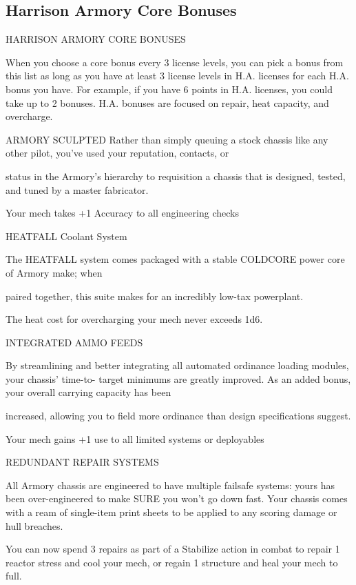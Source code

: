 \subsection{Harrison Armory Core Bonuses}

                           HARRISON ARMORY CORE BONUSES

When you choose a core bonus every 3 license levels, you can pick a bonus from this list as long
as you have at least 3 license levels in H.A. licenses for each H.A. bonus you have. For example,
if you have 6 points in H.A. licenses, you could take up to 2 bonuses. H.A. bonuses are focused
on repair, heat capacity, and overcharge.


ARMORY SCULPTED
Rather than simply queuing a stock chassis like any other pilot, you’ve used your reputation, contacts, or

status in the Armory’s hierarchy to requisition a chassis that is designed, tested, and tuned by a master
fabricator.

Your mech takes +1 Accuracy to all engineering checks


HEATFALL Coolant System

The HEATFALL system comes packaged with a stable COLDCORE power core of Armory make; when

paired together, this suite makes for an incredibly low-tax powerplant.

The heat cost for overcharging your mech never exceeds 1d6.


INTEGRATED AMMO FEEDS

By streamlining and better integrating all automated ordinance loading modules, your chassis’ time-to-
target minimums are greatly improved. As an added bonus, your overall carrying capacity has been

increased, allowing you to field more ordinance than design specifications suggest.

Your mech gains +1 use to all limited systems or deployables


REDUNDANT REPAIR SYSTEMS

All Armory chassis are engineered to have multiple failsafe systems: yours has been over-engineered to
make SURE you won’t go down fast. Your chassis comes with a ream of single-item print sheets to be
applied to any scoring damage or hull breaches.

You can now spend 3 repairs as part of a Stabilize action in combat to repair 1 reactor stress and
cool your mech, or regain 1 structure and heal your mech to full.


